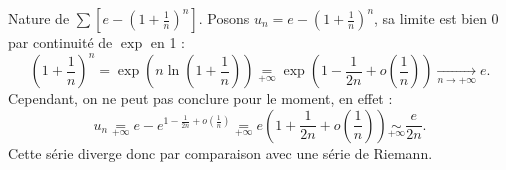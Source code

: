 \documentclass[11pt]{article}
\begin{document}
\begin{ex}{Nature de $\sum \left[ e - \left( 1 + \frac{1}{n} \right)^n \right]$.}{}
    Posons $u_n = e - \left( 1 + \frac{1}{n} \right)^n$, sa limite est bien 0 par continuité de $\exp$ en 1 :
    \begin{equation*}
        \left( 1 + \frac{1}{n} \right)^n = \exp\left(n\ln\left(1+\frac{1}{n}\right)\right) \underset{+\infty}{=} \exp\left(1 - \frac{1}{2n} + o\left( \frac{1}{n} \right)\right) \xrightarrow[n\to+\infty]{} e.
    \end{equation*}
    Cependant, on ne peut pas conclure pour le moment, en effet :
    \begin{equation*}
        u_n \underset{+\infty}{=} e - e^{1 - \frac{1}{2n} + o\left( \frac{1}{n} \right)} \underset{+\infty}{=} e\left(1 + \frac{1}{2n} + o\left( \frac{1}{n} \right)\right) \underset{+\infty}{\sim} \frac{e}{2n}.
    \end{equation*}
    Cette série diverge donc par comparaison avec une série de Riemann.
\end{ex}

\vspace*{-0.8cm}
\end{document}
